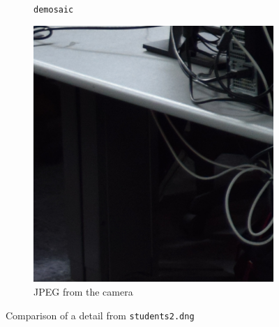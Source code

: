 \documentclass{article}
\newcommand{\inlinecode}[1]{\lstinline[basicstyle=\ttfamily,keywordstyle={}]{#1}}
\begin{document}
\begin{figure}[htbp]
\begin{subfigure}{.33\textwidth}
  \caption{\inlinecode{demosaic}}
\end{subfigure}%
  \begin{subfigure}{.33\textwidth}
  \centering
  \includegraphics[width=.95\linewidth]{camera_students2_detail}
  \caption{JPEG from the camera}
\end{subfigure}
\caption{Comparison of a detail from \inlinecode{students2.dng}}
\label{fig:dark_artifacts}
\end{figure}
\end{document}
